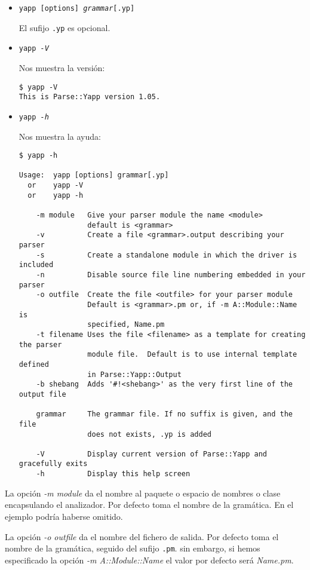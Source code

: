 \begin{itemize}
\item
{\tt yapp [options] \textit{grammar}[.yp]}

El sufijo {\tt .yp} es opcional.
\item
{\tt yapp \textit{-V}}

Nos muestra la versión:
\begin{verbatim}
$ yapp -V
This is Parse::Yapp version 1.05.
\end{verbatim}

\item
{\tt yapp \textit{-h}}

Nos muestra la ayuda:

\begin{verbatim}
$ yapp -h

Usage:  yapp [options] grammar[.yp]
  or    yapp -V
  or    yapp -h

    -m module   Give your parser module the name <module>
                default is <grammar>
    -v          Create a file <grammar>.output describing your parser
    -s          Create a standalone module in which the driver is included
    -n          Disable source file line numbering embedded in your parser
    -o outfile  Create the file <outfile> for your parser module
                Default is <grammar>.pm or, if -m A::Module::Name is
                specified, Name.pm
    -t filename Uses the file <filename> as a template for creating the parser
                module file.  Default is to use internal template defined
                in Parse::Yapp::Output
    -b shebang  Adds '#!<shebang>' as the very first line of the output file

    grammar     The grammar file. If no suffix is given, and the file
                does not exists, .yp is added

    -V          Display current version of Parse::Yapp and gracefully exits
    -h          Display this help screen

\end{verbatim}

\end{itemize}

La opción \textit{-m module} \mbox{}
da el nombre  al paquete o espacio de nombres o clase encapsulando el
analizador. Por defecto toma el nombre de la gramática.  En el ejemplo
podría haberse omitido.

La opción \textit{-o outfile} \mbox{}
da el nombre del fichero de salida. Por defecto toma el nombre de la gramática,
seguido del sufijo \verb|.pm|. sin embargo, si hemos especificado la opción
\textit{-m A::Module::Name} el valor por defecto será  \emph{Name.pm}.


